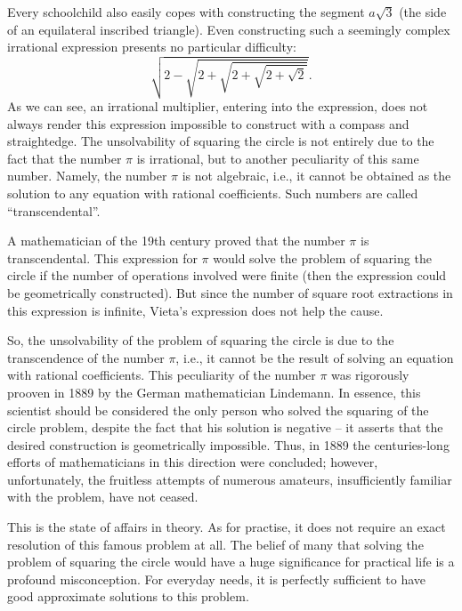 Every schoolchild also easily copes with constructing the segment $ a \sqrt{3}$ (the side of an equilateral inscribed triangle). Even constructing such a seemingly complex irrational expression presents no particular difficulty:
\begin{equation*}%
\sqrt{2 - \sqrt{2 + \sqrt{2 + \sqrt{2 +\sqrt{2}}}}}.
\end{equation*}
As we can see, an irrational multiplier, entering into the expression, does not always render this expression impossible to construct with a compass and straightedge. The unsolvability of squaring the circle is not entirely due to the fact that the number $\pi$ is irrational, but to another peculiarity of this same number. Namely, the number $\pi$ is not algebraic, i.e., it cannot be obtained as the solution to any equation with rational coefficients. Such numbers are called ``transcendental''.

A mathematician of the 19th century proved that the number $\pi$ is transcendental. This expression for $\pi$ would solve the problem of squaring the circle if the number of operations involved were finite (then the expression could be geometrically constructed). But since the number of square root extractions in this expression is infinite, Vieta's expression does not help the cause.

So, the unsolvability of the problem of squaring the circle is due to the transcendence of the number $\pi$, i.e., it cannot be the result of solving an equation with rational coefficients. This peculiarity of the number $\pi$ was rigorously prooven in 1889 by the German mathematician Lindemann. In essence, this scientist should be considered the only person who solved the squaring of the circle problem, despite the fact that his solution is negative -- it asserts that the desired construction is geometrically impossible. Thus, in 1889 the centuries-long efforts of mathematicians in this direction were concluded; however, unfortunately, the fruitless attempts of numerous amateurs, insufficiently familiar with the problem, have not ceased.

This is the state of affairs in theory. As for practise, it does not require an exact resolution of this famous problem at all. The belief of many that solving the problem of squaring the circle would have a huge significance for practical life is a profound misconception. For everyday needs, it is perfectly sufficient to have good approximate solutions to this problem.


